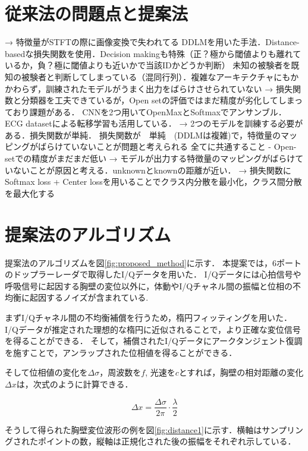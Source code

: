 \section{従来法の問題点と提案法}
→ 特徴量がSTFTの際に画像変換で失われてる
DDLMを用いた手法．Distance-basedな損失関数を使用．Decision makingも特殊（正？極から閾値よりも離れているか，負？極に閾値よりも近いかで当該IDかどうか判断）
未知の被験者を既知の被験者と判断してしまっている（混同行列）．複雑なアーキテクチャにもかかわらず，訓練されたモデルがうまく出力をばらけさせられていない
→ 損失関数と分類器を工夫できているが，Open setの評価ではまだ精度が劣化してしまっており課題がある．
CNNを2つ用いてOpenMaxとSoftmaxでアンサンブル．ECG datasetによる転移学習も活用している．
→ 2つのモデルを訓練する必要がある．損失関数が単純．
損失関数が~~単純~~(DDLMは複雑)で，特徴量のマッピングがばらけていないことが問題と考えられる
全てに共通すること
- Open-setでの精度がまだまだ低い
→ モデルが出力する特徴量のマッピングがばらけていないことが原因と考える．unknownとknownの距離が近い．
→ 損失関数にSoftmax loss + Center lossを用いることでクラス内分散を最小化，クラス間分散を最大化する

\section{提案法のアルゴリズム}
提案法のアルゴリズムを図\ref{fig:proposed_method}に示す．
本提案では，6ポートのドップラーレーダで取得したI/Qデータを用いた．
I/Qデータには心拍信号や呼吸信号に起因する胸壁の変位以外に，体動やI/Qチャネル間の振幅と位相の不均衡に起因するノイズが含まれている.

まずI/Qチャネル間の不均衡補償を行うため，楕円フィッティングを用いた．I/Qデータが推定された理想的な楕円に近似されることで，より正確な変位信号を得ることができる\cite{paper:ellipse1}\cite{paper:ellipse2}．
そして，補償されたI/Qデータにアークタンジェント復調を施すことで，アンラップされた位相値を得ることができる．

そして位相値の変化を$\Delta \sigma$，周波数を$f$, 光速を$c$とすれば，胸壁の相対距離の変化$\Delta x$は，次式のように計算できる．

\begin{equation}
	\Delta x = \frac{\Delta \sigma}{2 \pi} \cdot \frac{\lambda}{2}
\end{equation}

そうして得られた胸壁変位波形の例を図\ref{fig:distance1}に示す．横軸はサンプリングされたポイントの数，縦軸は正規化された後の振幅をそれぞれ示している．

